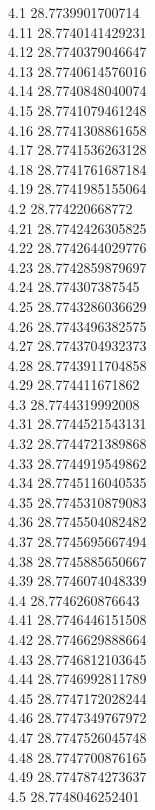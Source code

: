 {4.1	28.7739901700714\\
4.11	28.7740141429231\\
4.12	28.7740379046647\\
4.13	28.7740614576016\\
4.14	28.7740848040074\\
4.15	28.7741079461248\\
4.16	28.7741308861658\\
4.17	28.7741536263128\\
4.18	28.7741761687184\\
4.19	28.7741985155064\\
4.2	28.774220668772\\
4.21	28.7742426305825\\
4.22	28.7742644029776\\
4.23	28.7742859879697\\
4.24	28.774307387545\\
4.25	28.7743286036629\\
4.26	28.7743496382575\\
4.27	28.7743704932373\\
4.28	28.7743911704858\\
4.29	28.774411671862\\
4.3	28.7744319992008\\
4.31	28.7744521543131\\
4.32	28.7744721389868\\
4.33	28.7744919549862\\
4.34	28.7745116040535\\
4.35	28.7745310879083\\
4.36	28.7745504082482\\
4.37	28.7745695667494\\
4.38	28.7745885650667\\
4.39	28.7746074048339\\
4.4	28.7746260876643\\
4.41	28.7746446151508\\
4.42	28.7746629888664\\
4.43	28.7746812103645\\
4.44	28.7746992811789\\
4.45	28.7747172028244\\
4.46	28.7747349767972\\
4.47	28.7747526045748\\
4.48	28.7747700876165\\
4.49	28.7747874273637\\
4.5	28.7748046252401\\
}
